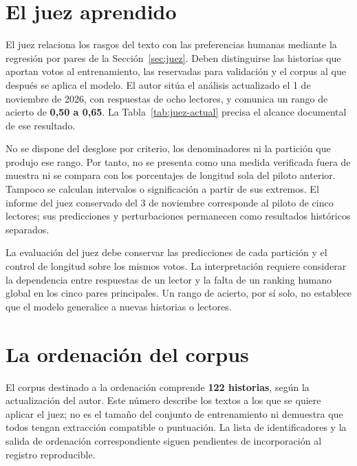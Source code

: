 \section{El juez aprendido}\label{sec:resultados-juez}

El juez relaciona los rasgos del texto con las preferencias humanas mediante la regresión por pares
de la Sección~\ref{sec:juez}. Deben distinguirse las historias que aportan votos al entrenamiento,
las reservadas para validación y el corpus al que después se aplica el modelo. El autor sitúa el
análisis actualizado el 1 de noviembre de 2026, con respuestas de ocho lectores, y comunica un rango
de acierto de \textbf{0,50 a 0,65}. La Tabla~\ref{tab:juez-actual} precisa el alcance documental de
ese resultado.

\begin{table}[htb]
  \centering
  \caption{Resultado comunicado del juez y alcance de su documentación}
  \label{tab:juez-actual}
  \small
  
\end{table}

No se dispone del desglose por criterio, los denominadores ni la partición que produjo ese rango.
Por tanto, no se presenta como una medida verificada fuera de muestra ni se compara con los
porcentajes de longitud sola del piloto anterior. Tampoco se calculan intervalos o significación a
partir de sus extremos. El informe del juez conservado del 3 de noviembre corresponde al piloto de
cinco lectores; sus predicciones y perturbaciones permanecen como resultados históricos separados.

La evaluación del juez debe conservar las predicciones de cada partición y el control de longitud
sobre los mismos votos. La interpretación requiere considerar la dependencia entre respuestas de
un lector y la falta de un ranking humano global en los cinco pares principales. Un rango de
acierto, por sí solo, no establece que el modelo generalice a nuevas historias o lectores.

\section{La ordenación del corpus}\label{sec:resultados-ranking}

El corpus destinado a la ordenación comprende \textbf{122 historias}, según la actualización del
autor. Este número describe los textos a los que se quiere aplicar el juez; no es el tamaño del
conjunto de entrenamiento ni demuestra que todos tengan extracción compatible o puntuación.
La lista de identificadores y la salida de ordenación correspondiente siguen pendientes de
incorporación al registro reproducible.

